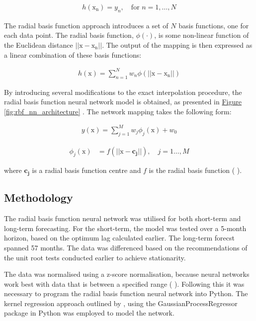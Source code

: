 \documentclass[11pt,a4paper]{article}
\newcommand{\citeboth}[1]{\citeauthor{#1} \citep{#1}}
\newcommand{\figref}[1]{%
    \hyperref[fig:#1]{Figure \ref{fig:#1}}%
}
\begin{document}
\begin{align}
  h(\boldsymbol{\mathrm{x_n}}) = y_n, \quad \text{for } n = 1, \ldots, N
\end{align}

The radial basis function approach 
introduces a set of $N$ basis functions, one for each 
data point. The radial basis function, $\phi(\cdot)$, is some non-linear function of the Euclidean distance
$||\boldsymbol{\mathrm{x}} - \boldsymbol{\mathrm{x_n}}||$. The output of the mapping is then expressed as a linear combination of these basis functions:

\begin{align}
    h(\boldsymbol{\mathrm{x}}) = \sum_{n=1}^{N} w_n \phi(||\boldsymbol{\mathrm{x}} - \boldsymbol{\mathrm{x_n}}||)
\end{align}

By introducing several modifications to the exact interpolation 
procedure, the radial basis function neural network
model is obtained, as presented in \figref{rbf_nn_architecture}. 
The network mapping takes the following form:

\begin{align}
    y(\boldsymbol{\mathrm{x}}) =  \sum_{j=1}^{M} w_{j} \phi_j(\boldsymbol{\mathrm{x}}) + w_{0}
\end{align}



\begin{align}
    \phi_j(\boldsymbol{\mathrm{x}})  &= f(||\boldsymbol{\mathrm{x}-c_j}||), \quad{j=1\ldots,M}
\end{align}

where $\boldsymbol{c_j}$ is a radial basis function centre and $f$ is the radial basis function (\citeboth{bishop1995}). 


\subsection{Methodology}

The radial basis function neural network was utilised for both short-term and long-term 
forecasting. For the short-term, 
the model was tested over a 5-month horizon, based on the optimum lag calculated earlier. 
The long-term forecst spanned 57 months. 
The data was differenced based on the recommendations of the 
unit root tests conducted earlier to achieve stationarity. 

The data was normalised using a z-score normalisation, because neural networks work best with data
that is between a specified range (\citeboth{mendelsohn1993}). Following this 
it was necessary to program the radial basis function neural network into Python. The kernel regression approach outlined by 
\citeboth{bishop1995}, using the GaussianProcessRegressor package in Python was employed to model the network.
\end{document}
